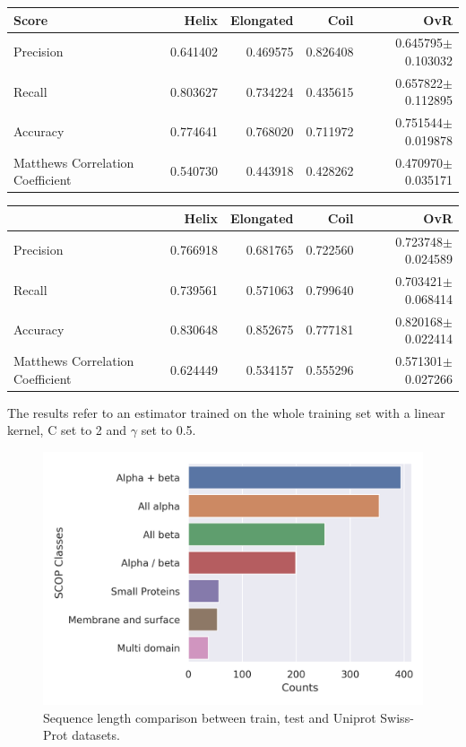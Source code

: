 \documentclass[nocrop]{bioinfo}
\begin{document}
\begin{supplementary}
\begin{table}[h]
{\begin{tabular}{lrrrr}
	\toprule
Score
	{} &              Helix &              Elongated &              Coil &            OvR  \\
	\midrule
	Precision                        & \num{0.641402} & \num{0.469575} & \num{0.826408} & \num{0.645795}$\pm$\num{0.103032} \\
	Recall                           & \num{0.803627} & \num{0.734224} & \num{0.435615} & \num{0.657822}$\pm$\num{0.112895} \\
	Accuracy                         & \num{0.774641} & \num{0.768020} & \num{0.711972} & \num{0.751544}$\pm$\num{0.019878} \\
	Matthews Correlation Coefficient & \num{0.540730} & \num{0.443918} & \num{0.428262} & \num{0.470970}$\pm$\num{0.035171} \\
	\bottomrule
\end{tabular}
}
{}	


 {	
\begin{tabular}{lrrrr}
	\toprule
	{} &              Helix &              Elongated &              Coil &            OvR\\
	\midrule
	Precision                        & \num{0.766918} & \num{0.681765} & \num{0.722560} & \num{0.723748}$\pm$\num{0.024589} \\
	Recall                           & \num{0.739561} & \num{0.571063} & \num{0.799640} & \num{0.703421}$\pm$\num{0.068414} \\
	Accuracy                         & \num{0.830648} & \num{0.852675} & \num{0.777181} & \num{0.820168}$\pm$\num{0.022414} \\
	Matthews Correlation Coefficient & \num{0.624449} & \num{0.534157} & \num{0.555296} & \num{0.571301}$\pm$\num{0.027266} \\
	\bottomrule
\end{tabular}
}
{The results refer to an estimator trained on the whole training set with a linear kernel, C set to 2 and $\gamma$ set to 0.5.}
\end{table}

\begin{figure}
	\includegraphics[width=\textwidth]{scop.png}
	\caption{Sequence length comparison between train, test and Uniprot Swiss-Prot datasets.}\label{fig:seq_length}
\end{figure}
\end{supplementary}
\end{document}
